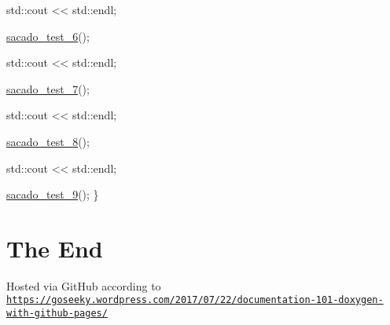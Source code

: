 \begin{DoxyCode}
    std::cout << std::endl;
 
    \hyperlink{Sacado__example_8cc_a27450ab52a9d4250e3f5a5f2a3f8f317}{sacado\_test\_6}();
 
    std::cout << std::endl;
 
    \hyperlink{Sacado__example_8cc_a0b694459e5e15c1578d97e637faba8de}{sacado\_test\_7}();
 
    std::cout << std::endl;
 
    \hyperlink{Sacado__example_8cc_aa7108ff8393b98d66dfef50899d048d9}{sacado\_test\_8}();
 
    std::cout << std::endl;
 
    \hyperlink{Sacado__example_8cc_ae176f83fe1943e102fe325d4a14f097e}{sacado\_test\_9}();
\}
\end{DoxyCode}
\hypertarget{index_END}{}\section{The End}\label{index_END}
Hosted via Git\+Hub according to \href{https://goseeky.wordpress.com/2017/07/22/documentation-101-doxygen-with-github-pages/}{\tt https\+://goseeky.\+wordpress.\+com/2017/07/22/documentation-\/101-\/doxygen-\/with-\/github-\/pages/} 